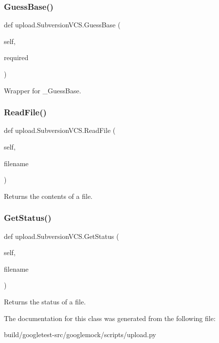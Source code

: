 \subsubsection{\texorpdfstring{Guess\+Base()}{GuessBase()}\hspace{0.1cm}{\footnotesize\ttfamily [2/2]}}
{\footnotesize\ttfamily def upload.\+Subversion\+V\+C\+S.\+Guess\+Base (\begin{DoxyParamCaption}\item[{}]{self,  }\item[{}]{required }\end{DoxyParamCaption})}

\begin{DoxyVerb}Wrapper for _GuessBase.\end{DoxyVerb}
 \mbox{\label{classupload_1_1SubversionVCS_a340d269b74386ac863636f6b0683d9f4}} 
\subsubsection{\texorpdfstring{Read\+File()}{ReadFile()}\hspace{0.1cm}{\footnotesize\ttfamily [2/2]}}
{\footnotesize\ttfamily def upload.\+Subversion\+V\+C\+S.\+Read\+File (\begin{DoxyParamCaption}\item[{}]{self,  }\item[{}]{filename }\end{DoxyParamCaption})}

\begin{DoxyVerb}Returns the contents of a file.\end{DoxyVerb}
 \mbox{\label{classupload_1_1SubversionVCS_ac3785eb1fa561088206d01570f9fe982}} 
\subsubsection{\texorpdfstring{Get\+Status()}{GetStatus()}\hspace{0.1cm}{\footnotesize\ttfamily [2/2]}}
{\footnotesize\ttfamily def upload.\+Subversion\+V\+C\+S.\+Get\+Status (\begin{DoxyParamCaption}\item[{}]{self,  }\item[{}]{filename }\end{DoxyParamCaption})}

\begin{DoxyVerb}Returns the status of a file.\end{DoxyVerb}
 

The documentation for this class was generated from the following file\+:\begin{DoxyCompactItemize}
\item 
build/googletest-\/src/googlemock/scripts/upload.\+py\end{DoxyCompactItemize}
